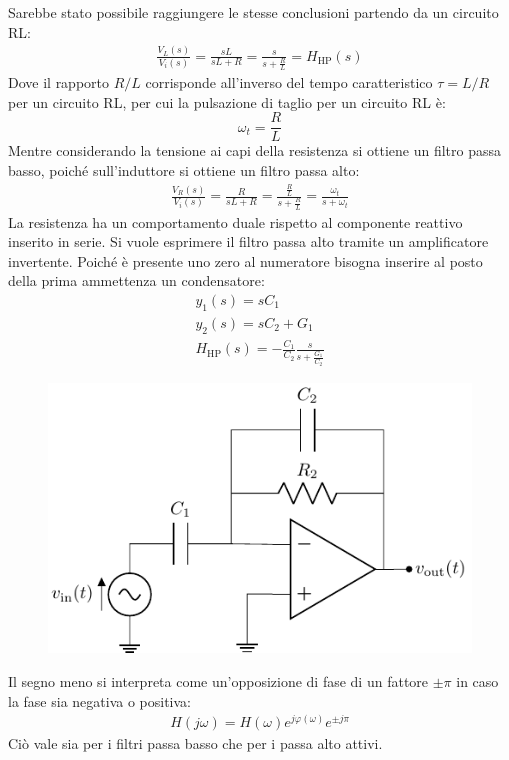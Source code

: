 \documentclass{article}
\numberwithin{equation}{subsection}
\begin{document}
Sarebbe stato possibile raggiungere le stesse conclusioni partendo da un circuito RL: 
\begin{gather*}
    \displaystyle\frac{V_L(s)}{V_i(s)}=\frac{sL}{sL+R}=\frac{s}{s+\displaystyle\frac{R}{L}}=H_{\mathrm{HP}}(s)
\end{gather*}
Dove il rapporto $R/L$ corrisponde all'inverso del tempo caratteristico $\tau=L/R$ per un circuito RL, per cui la pulsazione di taglio per un circuito 
RL è:
\begin{equation}
    \omega_t=\displaystyle\frac{R}{L}
\end{equation} 
Mentre considerando la tensione ai capi della resistenza si ottiene 
un filtro passa basso, poiché sull'induttore si ottiene un filtro passa alto:
\begin{gather*}
    \displaystyle\frac{V_R(s)}{V_i(s)}=\frac{R}{sL+R}=\frac{\displaystyle\frac{R}{L}}{s+\displaystyle\frac{R}{L}}=\frac{\omega_t}{s+\omega_t}
\end{gather*}
La resistenza ha un comportamento duale rispetto al componente reattivo inserito in serie. 
Si vuole esprimere il filtro passa alto tramite un amplificatore invertente. Poiché è presente uno zero al numeratore bisogna inserire al posto della prima ammettenza 
un condensatore:
\begin{gather*}
    y_1(s)=sC_1\\
    y_2(s)=sC_2+G_1\\
    H_{\mathrm{HP}}(s)=-\displaystyle\frac{C_1}{C_2}\frac{s}{s+\displaystyle\frac{G_1}{C_2}}
\end{gather*}
\begin{figure}[H]%
    \centering
    \includegraphics{passa-alto-primo-ordine-attivo.pdf}%
\end{figure}
Il segno meno si interpreta come un'opposizione di fase di un fattore $\pm\pi$ in caso la fase sia negativa o positiva:
\begin{gather*}
    H(j\omega)=H(\omega)e^{j\varphi(\omega)}e^{\pm j\pi}
\end{gather*}
Ciò vale sia per i filtri passa basso che per i passa alto attivi. 
\end{document}
